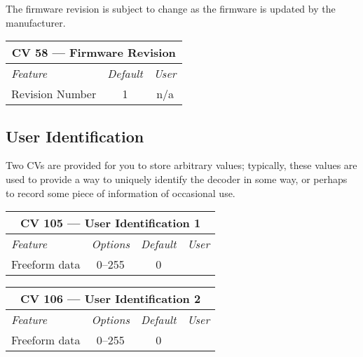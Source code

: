 \documentclass[12pt,letterpaper,draft]{memoir} %
\begin{document}
The firmware revision is subject to change as the firmware is updated by the manufacturer.
\label{CV58}
\begin{center}
\begin{tabular}{|l|c|c|}
\hline
\multicolumn{3}{|c|}{\textbf{CV 58 --- Firmware Revision}} \\ \hline \hline
\textit{Feature}& \textit{Default} & \textit{User} \\ \hline
Revision Number & 1 & n/a\\ \hline
\end{tabular}
\end{center}


\subsection{User Identification}
\label{UserIdentification}
Two CVs are provided for you to store arbitrary values; typically, these values are used to provide a way to uniquely identify the decoder in some way, or perhaps to record some piece of information of occasional use.

\label{CV105}
\begin{center}
\begin{tabular}{|l|c|c|c|}
\hline
\multicolumn{4}{|c|}{\textbf{CV 105 --- User Identification 1}} \\ \hline \hline
\textit{Feature} & \textit{Options} & \textit{Default} & \textit{User} \\ \hline
Freeform data & 0--255 & 0 &\\ \hline
\end{tabular}
\end{center}

\label{CV106}
\begin{center}
\begin{tabular}{|l|c|c|c|}
\hline
\multicolumn{4}{|c|}{\textbf{CV 106 --- User Identification 2}} \\ \hline \hline
\textit{Feature} & \textit{Options} & \textit{Default} & \textit{User} \\ \hline
Freeform data & 0--255 & 0 &\\ \hline
\end{tabular}
\end{center}

\end{document}

